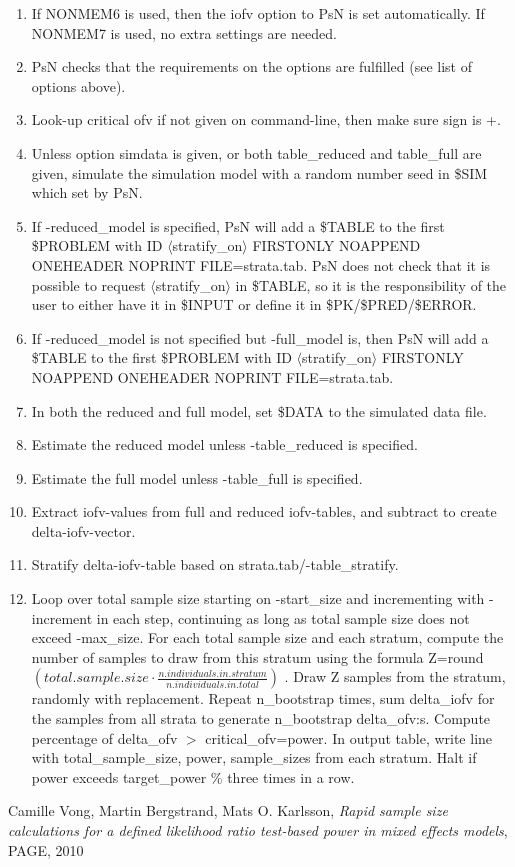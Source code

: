 \begin{enumerate}
\item If NONMEM6 is used, then the iofv option to PsN is set automatically. If NONMEM7 is used, no extra settings are needed.
\item PsN checks that the requirements on the options are fulfilled (see list of options above).
\item Look-up critical ofv if not given on command-line, then make sure sign is +.
\item Unless option simdata is given, or both table\_reduced and table\_full are given, simulate the simulation model with a random number seed in \$SIM which set by PsN.
\item If -reduced\_model is specified, PsN will add a \$TABLE to the first \$PROBLEM with ID $\langle$stratify\_on$\rangle$ FIRSTONLY NOAPPEND ONEHEADER NOPRINT FILE=strata.tab. PsN does not check that it is possible to request $\langle$stratify\_on$\rangle$ in \$TABLE, so it is the responsibility of the user to either have it in \$INPUT or define it in \$PK/\$PRED/\$ERROR.
\item If -reduced\_model is not specified but -full\_model is, then  PsN will add a \$TABLE to the first \$PROBLEM with ID $\langle$stratify\_on$\rangle$ FIRSTONLY NOAPPEND ONEHEADER NOPRINT FILE=strata.tab.
\item In both the reduced and full model, set \$DATA to the simulated data file.
\item Estimate the reduced model unless -table\_reduced is specified.
\item Estimate the full model unless -table\_full is specified.
\item Extract iofv-values from full and reduced iofv-tables, and subtract to create delta-iofv-vector.
\item Stratify delta-iofv-table based on strata.tab/-table\_stratify.
\item Loop over total sample size starting on -start\_size and incrementing with -increment in each step, continuing as long as total sample size does not exceed -max\_size. For each total sample size and each stratum, compute the number of samples to draw from this stratum using the formula
Z=round\begin{math}
(total.sample.size\cdot\frac{n.individuals.in.stratum}{n.individuals.in.total})
\end{math}
. Draw Z samples from the stratum, randomly with replacement. Repeat n\_bootstrap times, sum delta\_iofv for the samples from all strata to generate n\_bootstrap delta\_ofv:s. Compute percentage of delta\_ofv $>$ critical\_ofv=power. In output table, write line with total\_sample\_size, power, sample\_sizes from each stratum. Halt if power exceeds target\_power \% three times in a row.
\end{enumerate}

\begin{thebibliography}{1}
 Camille Vong, Martin Bergstrand, Mats O. Karlsson, {\em Rapid sample size calculations for a defined likelihood ratio test-based power in mixed effects models}, PAGE, 2010
\end{thebibliography}



